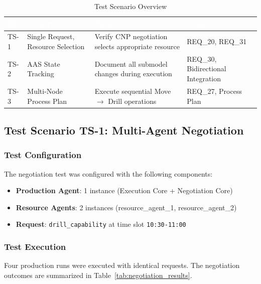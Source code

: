 \begin{table}[ht]
\centering
\caption{Test Scenario Overview}
\label{tab:test_scenarios}
\begin{tabular}{p{}p{}p{}p{}}
\toprule
\rowcolor{headerblue}
\textcolor{white}{ID} & \textcolor{white}{Scenario} & \textcolor{white}{Purpose} & \textcolor{white}{Validates} \\
\midrule
TS-1 & Single Request, Resource Selection & Verify CNP negotiation selects appropriate resource & REQ\_20, REQ\_31 \\
\rowcolor{lightgray}
TS-2 & AAS State Tracking & Document all submodel changes during execution & REQ\_30, Bidirectional Integration \\
TS-3 & Multi-Node Process Plan & Execute sequential Move $\rightarrow$ Drill operations & REQ\_27, Process Plan \\
\bottomrule
\end{tabular}
\end{table}

\subsection{Test Scenario TS-1: Multi-Agent Negotiation}
\label{subsec:ts1_negotiation}

\subsubsection{Test Configuration}

The negotiation test was configured with the following components:
\begin{itemize}
    \item \textbf{Production Agent}: 1 instance (Execution Core + Negotiation Core)
    \item \textbf{Resource Agents}: 2 instances (resource\_agent\_1, resource\_agent\_2)
    \item \textbf{Request}: \texttt{drill\_capability} at time slot \texttt{10:30-11:00}
\end{itemize}

\subsubsection{Test Execution}

Four production runs were executed with identical requests. The negotiation outcomes are summarized in Table~\ref{tab:negotiation_results}.

